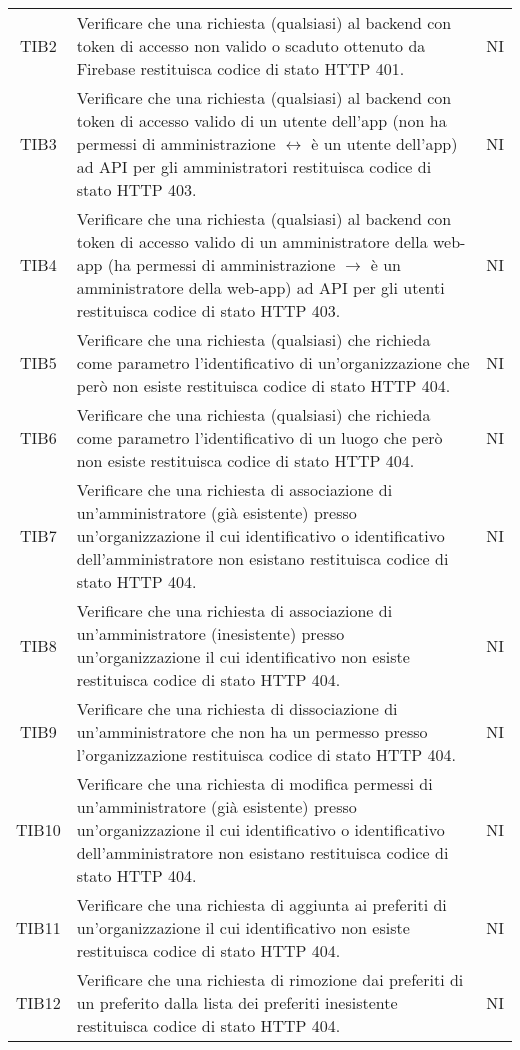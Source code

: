 {\begin{longtable}{ c C{13cm} C{1cm}}
TIB2 & Verificare che una richiesta (qualsiasi) al backend con token di accesso non valido o scaduto ottenuto da Firebase restituisca codice di stato HTTP 401. & NI \\
TIB3 & Verificare che una richiesta (qualsiasi) al backend con token di accesso valido di un utente dell'app (non ha permessi di amministrazione $\leftrightarrow$ è un utente dell'app) ad API per gli amministratori restituisca codice di stato HTTP 403. & NI \\
TIB4 & Verificare che una richiesta (qualsiasi) al backend con token di accesso valido di un amministratore della web-app (ha permessi di amministrazione $\rightarrow$ è un amministratore della web-app) ad API per gli utenti restituisca codice di stato HTTP 403. & NI \\
TIB5 & Verificare che una richiesta (qualsiasi) che richieda come parametro l'identificativo di un'organizzazione che però non esiste restituisca codice di stato HTTP 404. & NI \\
TIB6 & Verificare che una richiesta (qualsiasi) che richieda come parametro l'identificativo di un luogo che però non esiste restituisca codice di stato HTTP 404. & NI \\
TIB7 & Verificare che una richiesta di associazione di un'amministratore (già esistente) presso un'organizzazione il cui identificativo o identificativo dell'amministratore non esistano restituisca codice di stato HTTP 404. & NI \\
TIB8 & Verificare che una richiesta di associazione di un'amministratore (inesistente) presso un'organizzazione il cui identificativo non esiste restituisca codice di stato HTTP 404. & NI \\
TIB9 & Verificare che una richiesta di dissociazione di un'amministratore che non ha un permesso presso l'organizzazione restituisca codice di stato HTTP 404. & NI \\
TIB10 & Verificare che una richiesta di modifica permessi di un'amministratore (già esistente) presso un'organizzazione il cui identificativo o identificativo dell'amministratore non esistano restituisca codice di stato HTTP 404. & NI \\
TIB11 & Verificare che una richiesta di aggiunta ai preferiti di un'organizzazione il cui identificativo non esiste restituisca codice di stato HTTP 404. & NI \\
TIB12 & Verificare che una richiesta di rimozione dai preferiti di un preferito dalla lista dei preferiti inesistente restituisca codice di stato HTTP 404. & NI \\

\end{longtable}}
